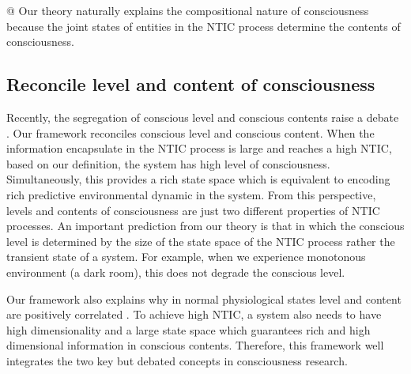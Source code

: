 \documentclass[utf8]{article}
\begin{document}
        
		\begin{WritingMaterials}
            @ Our theory naturally explains the compositional nature of consciousness because the joint states of entities in the NTIC process determine the contents of consciousness.

		\end{WritingMaterials}
			
			
			
	    \subsection{Reconcile level and content of consciousness}
	    Recently, the segregation of conscious level and conscious contents raise a debate \citep{bayne2016there, Fazekas2016}. Our framework reconciles conscious level and conscious content. When the information encapsulate in the NTIC process is large and reaches a high NTIC, based on our definition, the system has high level of consciousness. Simultaneously, this provides a rich state space which is equivalent to encoding rich predictive environmental dynamic in the system. From this perspective, levels and contents of consciousness are just two different properties of NTIC processes. An important prediction from our theory is that in which the conscious level is determined by the size of the state space of the NTIC process rather the transient state of a system. For example, when we experience monotonous environment (a dark room), this does not degrade the conscious level.
	    
	    Our framework also explains why in normal physiological states level and content are positively correlated \citep{laureys2005neural}\needfig{}. To achieve high NTIC, a system also needs to have high dimensionality and a large state space which guarantees rich and high dimensional information in conscious contents. Therefore, this framework well integrates the two key but debated concepts in consciousness research. 
			
			
			
\end{document}
